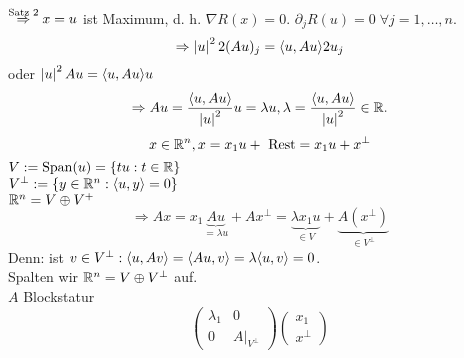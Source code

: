 \documentclass[../ana2.tex]{subfiles}
\begin{document}
\( \overset{\text{Satz 2}}{\Rightarrow} x=u \) ist Maximum, d. h. \( \nabla R(x) = 0 \).
\( \partial_j R(u) = 0 \;\forall j = 1,\ldots,n \).
\[ \Rightarrow \left|u\right|^2 2(Au)_j = \langle u, Au \rangle2u_j \]
oder \( \left|u\right|^2 Au = \langle u, Au \rangle u \)
\[ \Rightarrow Au = \frac{\langle u, Au \rangle}{\left|u\right|^2}u = \lambda u, 
\lambda = \frac{\langle u, Au \rangle}{\left|u\right|^2} \in \mathbb{R}. \]
\[ x \in \mathbb{R}^n, x = x_1 u + \text{ Rest} = x_1 u + x^\bot \]
\(V := \mathrm{Span}(u) = \{tu : t \in \mathbb{R}\}\)\\
\( V^\bot := \{y \in \mathbb{R}^n: \langle u, y \rangle = 0\} \)\\
\( \mathbb{R}^n = V \oplus V^+ \)
\[ \Rightarrow Ax = x_1\underbrace{Au}_{=\lambda u} + Ax^\bot 
= \underbrace{\lambda x_1 u}_{\in V} 
+ \underbrace{A(x^\bot)}_{\in V^\bot} \]
Denn: ist \( v \in V^\bot: \langle u, Av \rangle = \langle Au, v \rangle 
= \lambda \langle u, v \rangle = 0 \).\\
Spalten wir \( \mathbb{R}^n = V \oplus V^\bot \) auf.\\
\( A \) Blockstatur \gqq{\(=\)} 
\[ \begin{pmatrix} \lambda_1 & 0\\ 0 & A\vert_{V^\bot} \end{pmatrix} 
\begin{pmatrix} x_1 \\ x^\bot \end{pmatrix} \]
\end{document}
